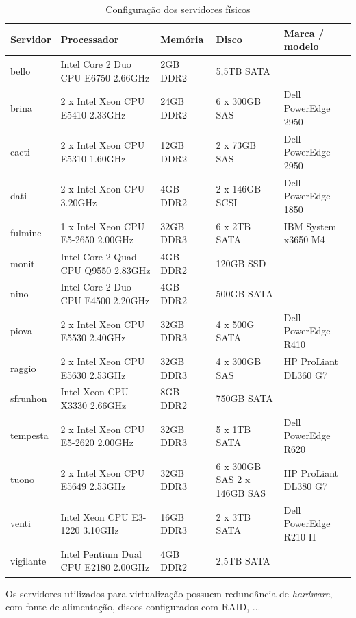 \begin{table}
\caption {Configuração dos servidores físicos}
\label{tab:servfisicos}
\begin{center}
\begin{tabular}{|l|p{3.8cm}|l|p{3cm}|l|}\hline
Servidor & Processador & Memória & Disco & Marca / modelo\\\hline
bello & Intel Core 2 Duo CPU E6750 2.66GHz & 2GB DDR2 & 5,5TB SATA & \\\hline
brina & 2 x Intel Xeon CPU E5410 2.33GHz & 24GB DDR2 & 6 x 300GB SAS & Dell PowerEdge 2950\\\hline
cacti & 2 x Intel Xeon CPU E5310 1.60GHz & 12GB DDR2 & 2 x 73GB SAS & Dell PowerEdge 2950\\\hline
dati & 2 x Intel Xeon CPU 3.20GHz & 4GB DDR2 & 2 x 146GB SCSI & Dell PowerEdge 1850\\\hline
fulmine & 1 x Intel Xeon CPU E5-2650 2.00GHz & 32GB DDR3 & 6 x 2TB SATA & IBM System x3650 M4\\\hline
monit & Intel Core 2 Quad CPU Q9550 2.83GHz & 4GB DDR2 & 120GB SSD & \\\hline
nino & Intel Core 2 Duo CPU E4500 2.20GHz & 4GB DDR2 & 500GB SATA & \\\hline
piova & 2 x Intel Xeon CPU E5530 2.40GHz & 32GB DDR3 & 4 x 500G SATA & Dell PowerEdge R410\\\hline
raggio & 2 x  Intel Xeon CPU E5630 2.53GHz & 32GB DDR3 & 4 x 300GB SAS & HP ProLiant DL360 G7\\\hline
sfrunhon & Intel Xeon CPU X3330 2.66GHz & 8GB DDR2 & 750GB SATA & \\\hline
tempesta & 2 x Intel Xeon CPU E5-2620 2.00GHz & 32GB DDR3 & 5 x 1TB SATA & Dell PowerEdge R620\\\hline
tuono & 2 x Intel Xeon CPU E5649 2.53GHz & 32GB DDR3 & 6 x 300GB SAS 2 x 146GB SAS & HP ProLiant DL380 G7\\\hline
venti & Intel Xeon CPU E3-1220 3.10GHz & 16GB DDR3 & 2 x 3TB SATA & Dell PowerEdge R210 II\\\hline
vigilante & Intel Pentium Dual CPU E2180 2.00GHz & 4GB DDR2 & 2,5TB SATA & \\\hline
\end{tabular}
\end{center}
\end{table}

Os servidores utilizados para virtualização possuem redundância de \textit{hardware}, com fonte de alimentação, discos configurados com \ac{RAID}, 
...

